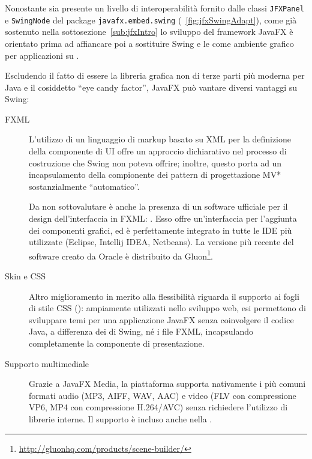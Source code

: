             Nonostante sia presente un livello di interoperabilità fornito dalle classi  \texttt{JFXPanel} e \texttt{SwingNode} del package \texttt{javafx\dothyp embed\dothyp swing} (\figurename~\ref{fig:jfxSwingAdapt}), come già sostenuto nella sottosezione~\ref{sub:jfxIntro} lo sviluppo del framework JavaFX è orientato prima ad affiancare poi a sostituire Swing e le  come ambiente grafico per applicazioni su .

            Escludendo il fatto di essere la libreria grafica non di terze parti più moderna per Java e il cosiddetto ``eye candy factor'', JavaFX può vantare diversi vantaggi su Swing:

            \begin{description}
              \item [FXML] L'utilizzo di un linguaggio di markup basato su XML per la definizione della componente di UI offre un approccio dichiarativo nel processo di costruzione che Swing non poteva offrire; inoltre, questo porta ad un incapsulamento della compionente  dei pattern di progettazione MV* sostanzialmente ``automatico''.

              Da non sottovalutare è anche la presenza di un software ufficiale per il design dell'interfaccia in FXML: . Esso offre un'interfaccia  per l'aggiunta dei componenti grafici, ed è perfettamente integrato in tutte le IDE più utilizzate (Eclipse, Intellij IDEA, Netbeans).
              La versione più recente del software creato da Oracle è distribuito da Gluon\footnote{\url{http://gluonhq.com/products/scene-builder/}}.

              \item[Skin e CSS] Altro miglioramento in merito alla flessibilità riguarda il supporto ai fogli di stile CSS (): ampiamente utilizzati nello sviluppo web, esi permettono di sviluppare temi per una applicazione JavaFX senza coinvolgere il codice Java, a differenza dei  di Swing, né i file FXML, incapsulando completamente la componente di presentazione.

              \item[Supporto multimediale] Grazie a JavaFX Media, la piattaforma supporta nativamente i più comuni formati audio (MP3, AIFF, WAV, AAC) e video (FLV con compressione VP6, MP4 con compressione H.264/AVC) senza richiedere l'utilizzo di librerie interne. Il supporto è incluso anche nella .


\end{description}
